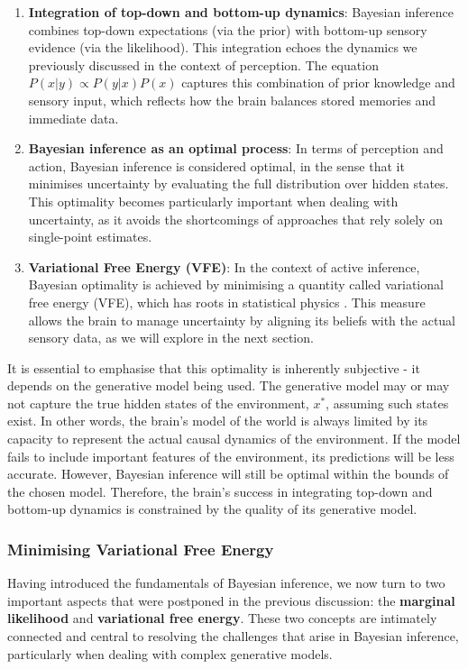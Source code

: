 \documentclass{article}
\begin{document}
\begin{enumerate}
	\item \textbf{Integration of top-down and bottom-up dynamics}: Bayesian inference combines top-down expectations (via the prior) with bottom-up sensory evidence (via the likelihood). This integration echoes the dynamics we previously discussed in the context of perception. The equation $P(x | y) \propto P(y | x) P(x)$ captures this combination of prior knowledge and sensory input, which reflects how the brain balances stored memories and immediate data.
	\item \textbf{Bayesian inference as an optimal process}: In terms of perception and action, Bayesian inference is considered optimal, in the sense that it minimises uncertainty by evaluating the full distribution over hidden states. This optimality becomes particularly important when dealing with uncertainty, as it avoids the shortcomings of approaches that rely solely on single-point estimates.
	\item \textbf{Variational Free Energy (VFE)}: In the context of active inference, Bayesian optimality is achieved by minimising a quantity called variational free energy (VFE), which has roots in statistical physics \citep{friston2006free}. This measure allows the brain to manage uncertainty by aligning its beliefs with the actual sensory data, as we will explore in the next section.
\end{enumerate}

It is essential to emphasise that this optimality is inherently subjective - it depends on the generative model being used. The generative model may or may not capture the true hidden states of the environment, $x^*$, assuming such states exist. In other words, the brain’s model of the world is always limited by its capacity to represent the actual causal dynamics of the environment. If the model fails to include important features of the environment, its predictions will be less accurate. However, Bayesian inference will still be optimal within the bounds of the chosen model. Therefore, the brain’s success in integrating top-down and bottom-up dynamics is constrained by the quality of its generative model.

\subsubsection{Minimising Variational Free Energy}

Having introduced the fundamentals of Bayesian inference, we now turn to two important aspects that were postponed in the previous discussion: the \textbf{marginal likelihood} and \textbf{variational free energy}. These two concepts are intimately connected and central to resolving the challenges that arise in Bayesian inference, particularly when dealing with complex generative models.
\end{document}
